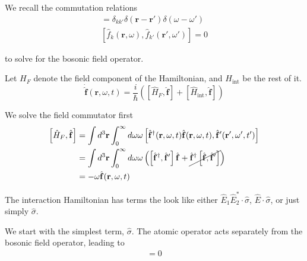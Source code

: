 \documentclass[a4paper, 11pt]{article}
\numberwithin{equation}{section}
\begin{document}
We recall the commutation relations
\begin{gather}
  [\hat{f}_k(\mathbf{r}, \omega), \hat{f}_{k'}^\dagger(\mathbf{r}', \omega')] =
  \delta_{kk'} \delta(\mathbf{r-r}')\delta(\omega-\omega')\\
  [\hat{f}_k(\mathbf{r}, \omega), \hat{f}_{k'}(\mathbf{r}',\omega')] = 0
\end{gather}

to solve for the bosonic field operator.

Let $H_F$ denote the field component of the Hamiltonian, and $H_{\text{int}}$ be the
rest of it.
\begin{equation}
  \dot{\hat{\mathbf{f}}}(\mathbf{r}, \omega, t) = \frac{i}{\hbar}\left( \left[
  \hat{H}_F, \hat{\mathbf{f}}\right] + \left[ \hat{H}_{\text{int}},
  \hat{\mathbf{f}}\right]\right)
\end{equation}

We solve the field commutator first
\begin{align*}
  \left[ \hat{H}_F, \hat{\mathbf{f}} \right] &= \int d^3\mathbf{r} \int_0^\infty
  d\omega\omega \left[ \hat{\mathbf{f}}^\dagger (\mathbf{r}, \omega, t)
  \hat{\mathbf{f}} (\mathbf{r}, \omega, t), \hat{\mathbf{f}}' (\mathbf{r}', \omega',
  t')\right]\\ &= \int d^3\mathbf{r} \int_0^\infty d\omega\omega \left(
  \left[ \hat{\mathbf{f}}^\dagger, \hat{\mathbf{f}}' \right]\hat{\mathbf{f}} +
  \cancel{\hat{\mathbf{f}}^\dagger \left[ \hat{\mathbf{f}}, \hat{\mathbf{f}}'
  \right]}\right)\\ &= -\omega\hat{\mathbf{f}}(\mathbf{r}, \omega, t)
\end{align*}

The interaction Hamiltonian has terms the look like either $\hat{E}_1\hat{E}_2^* \cdot
\hat{\sigma}$, $\hat{E} \cdot \hat{\sigma}$, or just simply $\hat{\sigma}$.

We start with the simplest term, $\hat{\sigma}$. The atomic operator acts separately
from the bosonic field operator, leading to
\begin{align*}
  [\hat{\sigma}, \hat{\mathbf{f}}] = 0
\end{align*}
\end{document}
